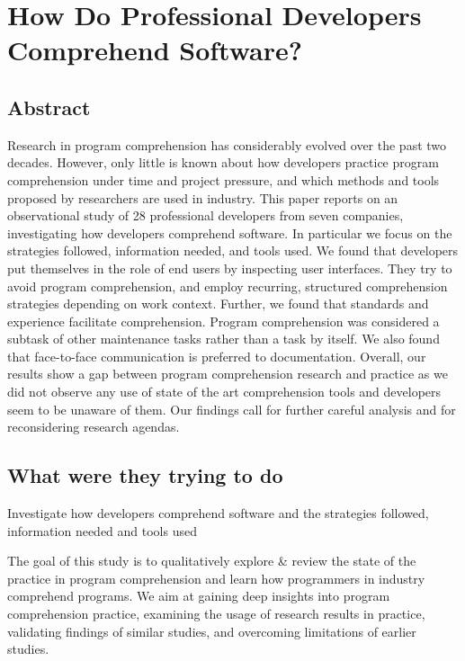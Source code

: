 \section{How Do Professional Developers Comprehend Software?}

\subsection{Abstract}

Research in program comprehension has considerably evolved over the past two decades. However, only little is known about how developers practice program comprehension under time and project pressure, and which methods and tools proposed by researchers are used in industry. This paper reports on an observational study of 28 professional developers from seven companies, investigating how developers comprehend software. In particular we focus on the strategies followed, information needed, and tools used. We found that developers put themselves in the role of end users by inspecting user interfaces. They try to avoid program comprehension, and employ recurring, structured comprehension strategies depending on work context. Further, we found that standards and experience facilitate comprehension. Program comprehension was considered a subtask of other maintenance tasks rather than a task by itself. We also found that face-to-face communication is preferred to documentation. Overall, our results show a gap between program comprehension research and practice as we did not observe any use of state of the art comprehension tools and developers seem to be unaware of them. Our findings call for further careful analysis and for reconsidering research agendas.

\subsection{What were they trying to do}

Investigate how developers comprehend software and the strategies followed, information needed and tools used

The goal of this study is to qualitatively explore \& review the state of the practice in program comprehension and learn how programmers in industry comprehend programs. We aim at gaining deep insights into program comprehension practice, examining the usage of research results in practice, validating findings of similar studies, and overcoming limitations of earlier studies.

